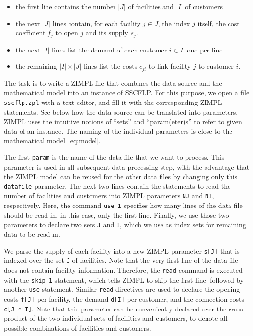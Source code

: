 \documentclass[a4paper,10pt]{article}
\begin{document}
\begin{itemize}
  \item the first line contains the number $|J|$ of facilities and $|I|$ of customers
  \item the next $|J|$ lines contain, for each facility $j \in J$, the index $j$ itself, the cost coefficient $f_{j}$ to open $j$ and its supply $s_{j}$.
  \item the next $|I|$ lines list the demand of each customer $i \in I$, one per line.
  \item the remaining $|I| \times |J|$ lines list the costs $c_{ji}$ to link facility $j$ to customer $i$.
\end{itemize}

The task is to write a ZIMPL file that combines the data source and the mathematical model into an instance of SSCFLP.
%
For this purpose, we open a file \texttt{sscflp.zpl} with a text editor, and fill it with the corresponding ZIMPL statements.
%
See below how the data source can be translated into parameters.
%
ZIMPL uses the intuitive notions of ``sets'' and ``param(eter)s''
to refer to given data of an instance.
%
The naming of the individual parameters is close to the mathematical model~\eqref{eq:model}.


  

The first \texttt{param} is the name of the data file that we want to process.
%
This parameter is used in all subsequent data processing step, with the advantage that the ZIMPL model can be reused for the other data files by changing only this \texttt{datafile} parameter.
%
The next two lines contain the statements to read the number of facilities and customers into ZIMPL parameters \texttt{NJ} and \texttt{NI}, respectively.
%
Here, the command \texttt{use 1} specifies how many lines of the data file should be read in, in this case, only the first line.
%
Finally, we use those two parameters to declare two sets \texttt{J} and \texttt{I}, which we use as index sets for remaining data to be read in.



We parse the supply of each facility into a new ZIMPL parameter \texttt{s[J]} that is indexed over the set \texttt{J} of facilities.
%
Note that the very first line of the data file does not contain facility information.
%
Therefore, the \texttt{read} command is executed with the \texttt{skip 1} statement, which tells ZIMPL to skip the first line, followed by another \texttt{use} statement.
%
Similar \texttt{read} directives are used to declare the opening costs \texttt{f[J]} per facility, the demand \texttt{d[I]} per customer, and the connection costs \texttt{c[J * I]}.
%
Note that this parameter can be conveniently declared over the cross-product of the two individual sets of facilities and customers,
to denote all possible combinations of facilities and customers.
%
\end{document}

